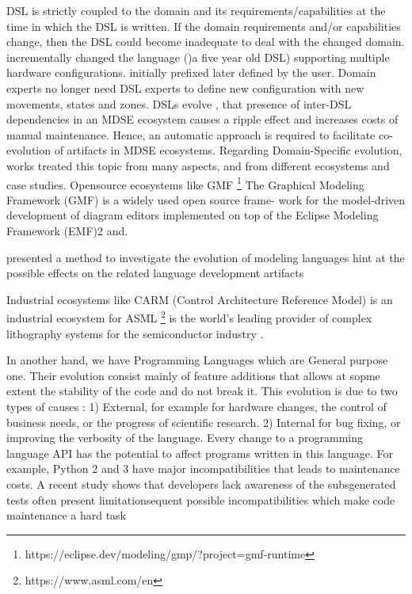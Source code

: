   
  DSL is strictly coupled to the domain and
  its requirements/capabilities at the time in which the DSL is written. If the domain requirements and/or capabilities change, then the DSL could become inadequate to deal with the changed domain.
  \cite{schuts2021industrial}  incrementally changed the language ()a five year old DSL) supporting multiple hardware configurations. initially prefixed later defined by the user. Domain experts no longer need DSL experts to define new configuration with new movements, states and zones.
  DSLs evolve \cite{favre2005languages,herrmannsdorfer2013coupled}, 
  that presence of inter-DSL dependencies in an MDSE ecosystem causes a ripple effect and increases costs of manual maintenance. Hence, an automatic approach is required to facilitate co-evolution of artifacts in MDSE ecosystems.
   Regarding Domain-Specific evolution, works treated this topic from many aspects, and from different ecosystems and case studies\cite{mengerink2016dsl}.
  Opensource ecosystems like GMF \footnote{https://eclipse.dev/modeling/gmp/?project=gmf-runtime} The Graphical Modeling Framework (GMF) is a widely used open source frame- work for the model-driven development of diagram editors implemented on top of the Eclipse Modeling Framework (EMF)2 and.
 
  
 \cite{10.1007/978-3-642-12107-4_3}  presented a method to investigate the evolution of modeling languages
  hint at the possible effects on the related language development artifacts
  
    
Industrial  ecosystems like CARM (Control Architecture Reference Model) is an industrial ecosystem for ASML \footnote{https://www.asml.com/en} is the world’s leading provider of complex lithography systems for the semiconductor industry  \cite{mengerink2016dsl}.

In another hand, we have Programming Languages which are General purpose one. Their evolution consist mainly of feature additions that allows at sopme extent the stability of the code and do not break it.
 This evolution is due to two types of causes : 1) External, for example for hardware changes, the control of business needs, or the progress of scientific research. 2) Internal for bug fixing, or improving the verbosity of the language.
 Every change to a programming language API has the potential to affect programs written
 in this language. For example, Python 2 and 3 have major incompatibilities that leads to maintenance costs.
 A recent study shows that developers lack awareness of the subsgenerated tests
 often present limitationsequent possible incompatibilities which make code maintenance a hard task \cite{dietrich2016java}
 
